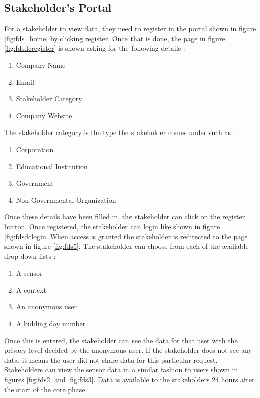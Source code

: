 \subsection{Stakeholder's Portal}

For a stakeholder to view data, they need to register in the portal shown in figure \ref{fig:fds_home} by clicking register. Once that is done,
the page in figure \ref{fig:fdsdcregister} is shown asking for the following details :

\begin{enumerate}
    \item Company Name
    \item Email
    \item Stakeholder Category
    \item Company Website
\end{enumerate}

The stakeholder category is the type the stakeholder comes under such as :

\begin{enumerate}
    \item Corporation
    \item Educational Institution
    \item Government
    \item Non-Governmental Organization
\end{enumerate}


Once these details have been filled in, the stakeholder can click on the register button. Once registered, the stakeholder can login like shown in figure \ref{fig:fdsdclogin}.When access is granted the stakeholder is redirected to the page shown in figure \ref{fig:fds5}. The stakeholder can choose from each of the available drop down lists :
\begin{enumerate}
    \item A sensor
    \item A context
    \item An anonymous user
    \item A bidding day number
\end{enumerate}

Once this is entered, the stakeholder can see the  data for that user with the privacy level decided by the anonymous user. If the stakeholder does not see any data, it means the user did not share data for this particular request. Stakeholders can view the sensor data in a similar fashion to users shown in figures \ref{fig:fds2} and \ref{fig:fds3}. Data is available to the stakeholders 24 hours after the start of the core phase.


